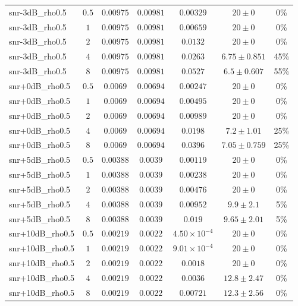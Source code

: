 \begin{longtable}{@{}lcccccc@{}}
snr-3dB\_rho0.5 & \(0.5\) & \(0.00975\) & \(0.00981\) & \(0.00329\) & \(20 \pm 0\) & 0\% \\
snr-3dB\_rho0.5 & \(1\) & \(0.00975\) & \(0.00981\) & \(0.00659\) & \(20 \pm 0\) & 0\% \\
snr-3dB\_rho0.5 & \(2\) & \(0.00975\) & \(0.00981\) & \(0.0132\) & \(20 \pm 0\) & 0\% \\
snr-3dB\_rho0.5 & \(4\) & \(0.00975\) & \(0.00981\) & \(0.0263\) & \(6.75 \pm 0.851\) & 45\% \\
snr-3dB\_rho0.5 & \(8\) & \(0.00975\) & \(0.00981\) & \(0.0527\) & \(6.5 \pm 0.607\) & 55\% \\
snr+0dB\_rho0.5 & \(0.5\) & \(0.0069\) & \(0.00694\) & \(0.00247\) & \(20 \pm 0\) & 0\% \\
snr+0dB\_rho0.5 & \(1\) & \(0.0069\) & \(0.00694\) & \(0.00495\) & \(20 \pm 0\) & 0\% \\
snr+0dB\_rho0.5 & \(2\) & \(0.0069\) & \(0.00694\) & \(0.00989\) & \(20 \pm 0\) & 0\% \\
snr+0dB\_rho0.5 & \(4\) & \(0.0069\) & \(0.00694\) & \(0.0198\) & \(7.2 \pm 1.01\) & 25\% \\
snr+0dB\_rho0.5 & \(8\) & \(0.0069\) & \(0.00694\) & \(0.0396\) & \(7.05 \pm 0.759\) & 25\% \\
snr+5dB\_rho0.5 & \(0.5\) & \(0.00388\) & \(0.0039\) & \(0.00119\) & \(20 \pm 0\) & 0\% \\
snr+5dB\_rho0.5 & \(1\) & \(0.00388\) & \(0.0039\) & \(0.00238\) & \(20 \pm 0\) & 0\% \\
snr+5dB\_rho0.5 & \(2\) & \(0.00388\) & \(0.0039\) & \(0.00476\) & \(20 \pm 0\) & 0\% \\
snr+5dB\_rho0.5 & \(4\) & \(0.00388\) & \(0.0039\) & \(0.00952\) & \(9.9 \pm 2.1\) & 5\% \\
snr+5dB\_rho0.5 & \(8\) & \(0.00388\) & \(0.0039\) & \(0.019\) & \(9.65 \pm 2.01\) & 5\% \\
snr+10dB\_rho0.5 & \(0.5\) & \(0.00219\) & \(0.0022\) & \(4.50{\times}10^{-4}\) & \(20 \pm 0\) & 0\% \\
snr+10dB\_rho0.5 & \(1\) & \(0.00219\) & \(0.0022\) & \(9.01{\times}10^{-4}\) & \(20 \pm 0\) & 0\% \\
snr+10dB\_rho0.5 & \(2\) & \(0.00219\) & \(0.0022\) & \(0.0018\) & \(20 \pm 0\) & 0\% \\
snr+10dB\_rho0.5 & \(4\) & \(0.00219\) & \(0.0022\) & \(0.0036\) & \(12.8 \pm 2.47\) & 0\% \\
snr+10dB\_rho0.5 & \(8\) & \(0.00219\) & \(0.0022\) & \(0.00721\) & \(12.3 \pm 2.56\) & 0\% \\

\end{longtable}
